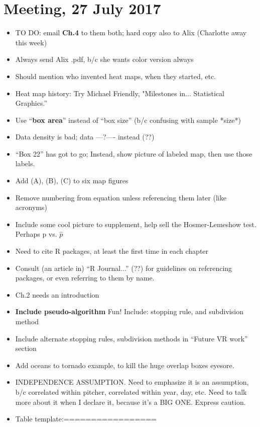 \documentclass{article}
\begin{document}
\section*{Meeting, 27 July 2017}
\begin{itemize}
\item TO DO: email {\bf Ch.4} to them both; hard copy also to Alix (Charlotte away this week) \checkmark
\item Always send Alix .pdf, b/c she wants color version always \checkmark
\item Should mention who invented heat maps, when they started, etc.
\item Heat map history: Try Michael Friendly, "Milestones in... Statistical Graphics.''
\item Use ``{\bf box area}'' instead of ``box size'' (b/c confusing with sample *size*)
\item Data density is bad; data ---?---- instead (??)
\item ``Box 22'' has got to go; Instead, show picture of labeled map, then use those labels.
\item Add (A), (B), (C) to six map figures
\item Remove numbering from equation unless referencing them later (like acronyms)
\item Include some cool picture to supplement, help sell the Hosmer-Lemeshow test. Perhaps p vs. $\hat{p}$
\item Need to cite R packages, at least the first time in each chapter
\item Consult (an article in) ``R Journal...'' (??)  for guidelines on referencing packages, or even referring to them by name.
\item Ch.2 needs an introduction
\item {\bf Include pseudo-algorithm} Fun! Include: stopping rule, and subdivision method
\item Include alternate stopping rules, subdivision methods in ``Future VR work'' section
\item Add oceans to tornado example, to kill the huge overlap boxes eyesore.
\item INDEPENDENCE ASSUMPTION. Need to emphasize it is an assumption, b/c correlated within pitcher, correlated within year, day, etc. Need to talk more about it when I declare it, because it's a BIG ONE. Express caution.
\item Table template:=================

\end{itemize}
\end{document}
